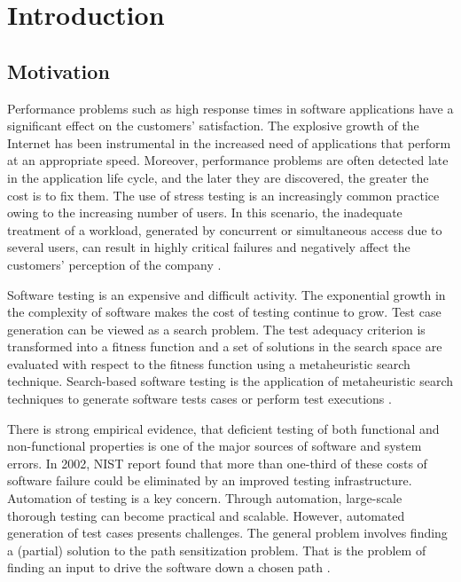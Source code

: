 \documentclass[espaco=umemeio,chapter=TITLE,twoside,openright]{abnt}
\begin{document}




%



\chapter{Introduction}

\section{Motivation}

Performance problems such as high response times in software applications have a significant effect on the customers’  satisfaction. The explosive growth of the Internet has been instrumental in the increased need of applications that perform at an appropriate speed. Moreover, performance problems are often detected late in the application life cycle, and the later they are discovered, the greater the cost is to fix them. The use of stress testing is an increasingly common practice owing to the increasing number of users. In this scenario, the inadequate treatment of a workload,  generated by concurrent or simultaneous access due to several users, can result in highly critical failures and negatively affect the customers' perception of the company  \cite{Jiang2010} \cite{Molyneaux2009} \cite{Wert2014}.

Software testing is an expensive and difficult activity. The exponential
growth in the complexity of software makes the cost of testing continue to grow. Test case generation can be viewed as a search problem. The test adequacy criterion is transformed into a fitness function and a set of solutions in the search
space are evaluated with respect to the fitness function using a metaheuristic search technique. Search-based software testing is the application of metaheuristic search techniques to generate software
tests cases or perform test executions \cite{Afzal2009a}.

There is strong empirical evidence, that deficient
testing of both functional and non-functional properties
is one of the major sources of software and system errors. In 2002, NIST  report found that more than one-third of these costs of software failure could be eliminated by an improved testing infrastructure.
Automation of testing is a key concern. Through
automation, large-scale thorough testing can become
practical and scalable. However, automated generation of test cases presents challenges. The general problem involves finding a (partial) solution to the path sensitization problem. That is the problem of finding an input to drive the software down a chosen path \cite{Harman2010} \cite{dean2003managing}.
\end{document}
